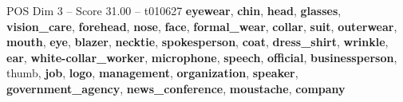 \begin{textsample}{POS Dim 3 – Score 31.00 – t010627}  \label{ex:f3_pos_021}
\textbf{eyewear}, \textbf{chin}, \textbf{head}, \textbf{glasses}, \textbf{vision\_care}, \textbf{forehead}, \textbf{nose}, \textbf{face}, \textbf{formal\_wear}, \textbf{collar}, \textbf{suit}, \textbf{outerwear}, \textbf{mouth}, \textbf{eye}, \textbf{blazer}, \textbf{necktie}, \textbf{spokesperson}, \textbf{coat}, \textbf{dress\_shirt}, \textbf{wrinkle}, \textbf{ear}, \textbf{white-collar\_worker}, \textbf{microphone}, \textbf{speech}, \textbf{official}, \textbf{businessperson}, thumb, \textbf{job}, \textbf{logo}, \textbf{management}, \textbf{organization}, \textbf{speaker}, \textbf{government\_agency}, \textbf{news\_conference}, \textbf{moustache}, \textbf{company}

\end{textsample}
